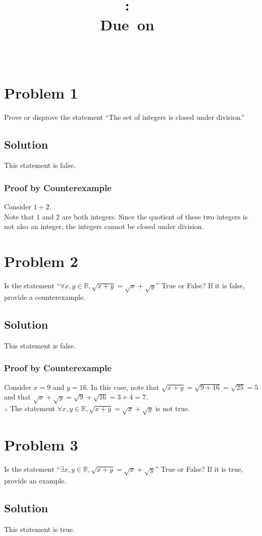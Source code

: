 \documentclass[table]{article}
\title{
    \vspace{2in}
    \textmd{\textbf{\hmwkClass:\ \hmwkTitle}}\\
    \normalsize\vspace{0.1in}\small{Due\ on\ \hmwkDueDate}\\
    \vspace{0.1in}\large{\textit{\hmwkClassInstructor\ \hmwkClassTime}}
    \vspace{3in}
}
\author{\hmwkAuthorName}
\date{}
\begin{document}
\maketitle
\pagebreak
\section{Problem 1}
Prove or disprove the statement ``The set of integers is closed under division.''
\subsection{Solution}
This statement is false.
\subsubsection{Proof by Counterexample}
Consider $1 \div 2$.\\
Note that $1$ and $2$ are both integers. Since the quotient of these two integers is not also an integer, the integers cannot be closed under division.
\section{Problem 2}
Is the statement ``$\forall x,y \in \mathbb{R}, \sqrt{x + y} = \sqrt{x} + \sqrt{y}$'' True or False? If it is false, provide a counterexample.
\subsection{Solution}
This statement is false.
\subsubsection{Proof by Counterexample}
Consider $x=9$ and $y=16$. In this case, note that $\sqrt{x+y} = \sqrt{9+16} = \sqrt{25} = 5$ and that $\sqrt{x} + \sqrt{y}= \sqrt{9} + \sqrt{16} = 3 + 4 = 7$.\\
$\therefore$ The statement $\forall x,y \in \mathbb{R}, \sqrt{x + y} = \sqrt{x} + \sqrt{y}$ is not true.
\section{Problem 3}
Is the statement ``$\exists x,y \in \mathbb{R}, \sqrt{x + y} = \sqrt{x} + \sqrt{y}$'' True or False? If it is true, provide an example.
\subsection{Solution}
This statement is true.
\end{document}
